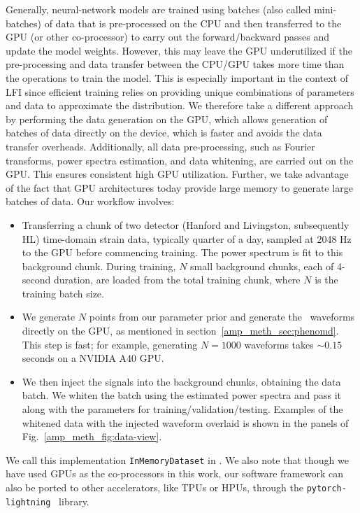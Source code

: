 \begin{refsection}
Generally, neural-network models are trained using batches (also called mini-batches) of data that is pre-processed on the CPU and then transferred to the GPU (or other co-processor) to carry out the forward/backward passes and update the model weights.
However, this may leave the GPU underutilized if the pre-processing and data transfer between the CPU/GPU takes more time than the operations to train the model.
This is especially important in the context of LFI since efficient training relies on providing unique combinations of parameters and data to approximate the distribution. 
We therefore take a different approach by performing the data generation on the GPU, which allows generation of batches of data directly on the device, which is faster and avoids the data transfer overheads. 
Additionally, all data pre-processing, such as Fourier transforms, power spectra estimation, and data whitening, are carried out on the GPU. 
This ensures consistent high GPU utilization. 
Further, we take advantage of the fact that GPU architectures today provide large memory to generate large batches of data. 
Our workflow involves:
\begin{itemize}
    \item Transferring a chunk of two detector (Hanford and Livingston, subsequently HL) time-domain strain data, typically quarter of a day, sampled at 2048 Hz to the GPU before commencing training. 
    The power spectrum is fit to this background chunk.
    During training, $N$ small background chunks, each of 4-second duration, are loaded from the total training chunk, where $N$ is the training batch size.
    \item We generate $N$ points from our parameter prior and generate the \phenomd~waveforms directly on the GPU, as mentioned in section~\ref{amp_meth_sec:phenomd}. 
    This step is fast; for example, generating $N=1000$ waveforms takes $\sim 0.15$ seconds on a NVIDIA A40 GPU. 
    \item We then inject the signals into the background chunks, obtaining the data batch. 
    We whiten the batch using the estimated power spectra and pass it along with the parameters for training/validation/testing. 
    Examples of the whitened data with the injected waveform overlaid is shown in the panels of Fig.~\ref{amp_meth_fig:data-view}.
\end{itemize}
We call this implementation {\tt InMemoryDataset} in \mlgw. 
We also note that though we have used GPUs as the co-processors in this work, our software framework can also be ported to other accelerators, like TPUs or HPUs, through the {\tt pytorch-\allowbreak lightning}~\cite{falcon_2024_10779019} library.


\end{refsection}
